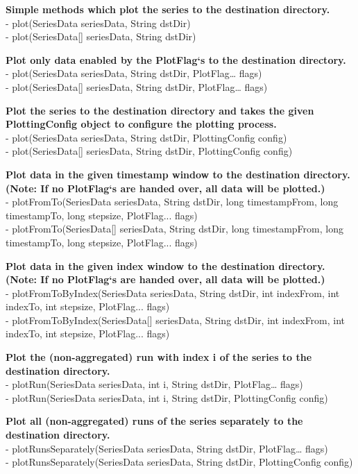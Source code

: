\textbf{Simple methods which plot the series to the destination directory.}\\
- plot(SeriesData seriesData, String dstDir)\\
- plot(SeriesData[] seriesData, String dstDir)

\textbf{Plot only data enabled by the PlotFlag‘s to the destination directory.}\\
- plot(SeriesData seriesData, String dstDir, PlotFlag… flags)\\
- plot(SeriesData[] seriesData, String dstDir, PlotFlag… flags)

\textbf{Plot the series to the destination directory and takes the given PlottingConfig object to configure the plotting process.}\\
- plot(SeriesData seriesData, String dstDir, PlottingConfig config)\\
- plot(SeriesData[] seriesData, String dstDir, PlottingConfig config)

\textbf{Plot data in the given timestamp window to the destination directory. (Note: If no PlotFlag‘s are handed over, all data will be plotted.)}\\
- plotFromTo(SeriesData seriesData, String dstDir, long timestampFrom, long timestampTo, long stepsize, PlotFlag... flags)\\
- plotFromTo(SeriesData[] seriesData, String dstDir, long timestampFrom, long timestampTo, long stepsize, PlotFlag... flags)

\textbf{Plot data in the given index window to the destination directory.
(Note: If no PlotFlag‘s are handed over, all data will be plotted.)}\\
- plotFromToByIndex(SeriesData seriesData, String dstDir, int indexFrom, int indexTo, int stepsize, PlotFlag... flags)\\
- plotFromToByIndex(SeriesData[] seriesData, String dstDir, int indexFrom, int indexTo, int stepsize, PlotFlag... flags)

\textbf{Plot the (non-aggregated) run with index i of the series to the destination directory.}\\
- plotRun(SeriesData seriesData, int i, String dstDir, PlotFlag… flags)\\
- plotRun(SeriesData seriesData, int i, String dstDir, PlottingConfig config)

\textbf{Plot all (non-aggregated) runs of the series separately to the destination directory.}\\
- plotRunsSeparately(SeriesData seriesData, String dstDir, PlotFlag… flags)\\
- plotRunsSeparately(SeriesData seriesData, String dstDir, PlottingConfig config)

